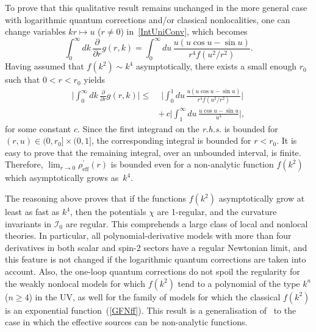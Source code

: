 \documentclass[aps,prd,a4paper,twocolumn,showpacs,showkeys,preprintnumbers,amsmath,amssymb,nofootinbib]{revtex4-2}
\numberwithin{equation}{section}
\newcommand{\eq}[1]{(\ref{#1})}
\def\pa{\partial}
\begin{document}
To prove that this qualitative result remains unchanged in the more general case with logarithmic quantum corrections and/or classical nonlocalities, one can change variables $kr \mapsto u$ ($r \neq 0$) in~\eqref{IntUniConv}, which becomes
%
\begin{equation}
\int_{0}^{\infty} dk \, \frac{\pa}{\pa r}g(r,k) = \int_{0}^{\infty} du \, \frac{u  \left( u \cos u - \sin u \right) }{r^4 f(u^2/r^2)} .
\end{equation}
Having assumed that $f(k^2) \sim k^4$ asymptotically, there exists a small enough $r_0$ such that $0< r < r_0$ yields
%
\begin{equation} \label{ultima}
\begin{split}
\bigg\vert \int_{0}^{\infty} dk \, \frac{\pa}{\pa r}g(r,k) \bigg\vert \leqslant & \,\, \bigg\vert \int_{0}^{1} du \, \frac{u \left( u \cos u - \sin u \right) }{r^4 f(u^2/r^2)} \bigg\vert 
\\
& +  \, c \bigg\vert \int_{1}^{\infty} du \, \frac{u \cos u - \sin u }{u^3} \bigg\vert  ,
\end{split}
\end{equation}
for some constant $c$. 
Since the first integrand on the \textit{r.h.s.} is bounded for $(r,u) \in (0,r_0]\times (0,1]$, the corresponding integral is bounded for $r<r_0$. It is easy to prove that the remaining integral, over an unbounded interval, is finite. 
Therefore, $\lim_{r\to 0}\rho_\text{eff}^\prime(r)$ is bounded even for a non-analytic function $f(k^2)$ which  asymptotically grows as~$k^4$.


The reasoning above proves that if the functions $f(k^2)$ asymptotically grow at least as fast as $k^{4}$, then the potentials $\chi$ are 1-regular, and the curvature invariants in $\mathscr{I}_{0}$ are regular. This comprehends a large class of local and nonlocal theories. In particular, all polynomial-derivative models with more than four derivatives in both scalar and spin-2 sectors have a regular Newtonian limit, and this feature is not changed if the logarithmic quantum corrections are taken into account. Also, the one-loop quantum corrections do not spoil the regularity for the weakly nonlocal models for which $f(k^2)$ tend to a polynomial of the type $k^{n}$ ($n\geqslant 4$) in the UV, as well for the family of models for which the classical $f(k^2)$ is an exponential function~\eq{GFNff}. This result is a generalisation of~\cite{BreTib2} to the case in which the effective sources can be non-analytic functions. 
\end{document}
